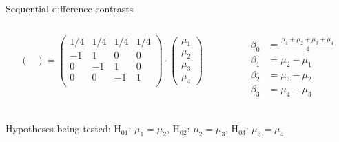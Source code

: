 \documentclass[aspectratio=169]{beamer}
\begin{document}
\begin{frame}{Sequential difference contrasts}
\begin{columns}
\begin{column}[t]{.5\textwidth}
\[\begin{pmatrix}
  \end{pmatrix} = 
  \begin{pmatrix}
    1/4 & 1/4 & 1/4 & 1/4 \\ 
     -1 &   1 &   0 &   0 \\ 
      0 &  -1 &   1 &   0 \\ 
      0 &   0 &  -1 &   1 \\ 
  \end{pmatrix} \cdot
  \begin{pmatrix}
    \mu_1 \\
    \mu_2 \\
    \mu_3 \\
    \mu_4
  \end{pmatrix}
\]
    \end{column}
    \begin{column}[t]{.5\textwidth}
\begin{align*}
  \beta_0 & = \frac{\mu_1 + \mu_2 + \mu_3 + \mu_4}{4} \\
  \beta_1 & = \mu_2 - \mu_1 \\
  \beta_2 & = \mu_3 - \mu_2 \\
  \beta_3 & = \mu_4 - \mu_3 \\
\end{align*}
    \end{column}
  \end{columns}
  \vspace{-.8cm}
Hypotheses being tested:
H$_{01}$: $\mu_1 = \mu_2$,
H$_{02}$: $\mu_2 = \mu_3$,
H$_{03}$: $\mu_3 = \mu_4$
\end{frame}
\end{document}
